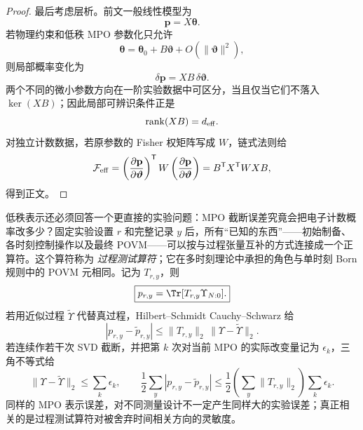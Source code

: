 \begin{proof}
最后考虑层析。前文一般线性模型为
\[
\mathbf p=X\boldsymbol\theta.
\]
若物理约束和低秩 MPO 参数化只允许
\[
\boldsymbol\theta
=
\boldsymbol\theta_0
+
B\boldsymbol\vartheta
+O(\|\boldsymbol\vartheta\|^2),
\]
则局部概率变化为
\[
\delta\mathbf p
=
XB\,\delta\boldsymbol\vartheta.
\]
两个不同的微小参数方向在一阶实验数据中可区分，当且仅当它们不落入
$\ker(XB)$；因此局部可辨识条件正是
\[
\operatorname{rank}(XB)=d_{\rm eff}.
\]
对独立计数数据，若原参数的 Fisher 权矩阵写成 $W$，链式法则给
\[
\mathcal F_{\rm eff}
=
\left(\frac{\partial\mathbf p}{\partial\boldsymbol\vartheta}\right)^{\mathsf T}
W
\left(\frac{\partial\mathbf p}{\partial\boldsymbol\vartheta}\right)
=
B^{\mathsf T}X^{\mathsf T}WXB,
\]
得到正文。
\end{proof}


低秩表示还必须回答一个更直接的实验问题：MPO 截断误差究竟会把电子计数概率改多少？固定实验设置 $r$ 和完整记录 $y$ 后，所有“已知的东西”——初始制备、各时刻控制操作以及最终 POVM——可以按与过程张量互补的方式连接成一个正算符。这个算符称为 \emph{过程测试算符}；它在多时刻理论中承担的角色与单时刻 Born 规则中的 POVM 元相同。记为 $T_{r,y}$，则
\begin{equation}
\boxed{p_{r,y}=\Tr[T_{r,y}\Upsilon_{N:0}].}
\label{eq:process_tester_probability_linear_functional}
\end{equation}
若用近似过程 $\widetilde\Upsilon$ 代替真过程，Hilbert--Schmidt Cauchy--Schwarz 给
\begin{equation}
\boxed{
|p_{r,y}-\widetilde p_{r,y}|
\le\|T_{r,y}\|_2\,
\|\Upsilon-\widetilde\Upsilon\|_2.}
\label{eq:process_probability_hs_error_bound}
\end{equation}
若连续作若干次 SVD 截断，并把第 $k$ 次对当前 MPO 的实际改变量记为 $\epsilon_k$，三角不等式给
\begin{equation}
\boxed{
\|\Upsilon-\widetilde\Upsilon\|_2\le\sum_k\epsilon_k,
\qquad
\frac12\sum_y|p_{r,y}-\widetilde p_{r,y}|
\le
\frac12\left(\sum_y\|T_{r,y}\|_2\right)\sum_k\epsilon_k.}
\label{eq:process_mpo_total_variation_error_bound}
\end{equation}
同样的 MPO 表示误差，对不同测量设计不一定产生同样大的实验误差；真正相关的是过程测试算符对被舍弃时间相关方向的灵敏度。


